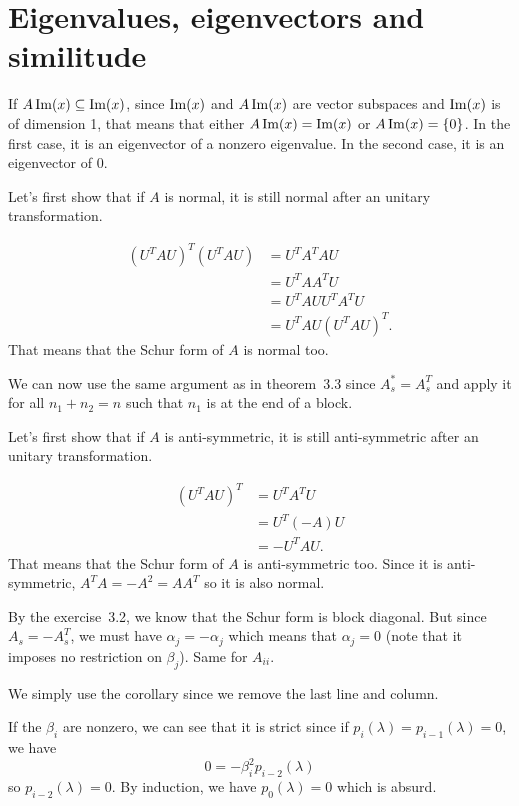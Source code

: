 \section{Eigenvalues, eigenvectors and similitude}
\begin{solution}
  If $A \operatorname{Im}(x) \subseteq \operatorname{Im}(x)$, since $\operatorname{Im}(x)$ and $A\operatorname{Im}(x)$
  are vector subspaces and $\operatorname{Im}(x)$ is of dimension 1,
  that means that either $A\operatorname{Im}(x) = \operatorname{Im}(x)$ or $A\operatorname{Im}(x) = \{0\}$.
  In the first case, it is an eigenvector of a nonzero eigenvalue.
  In the second case, it is an eigenvector of 0.
\end{solution}

\begin{solution}
  Let's first show that if $A$ is normal,
  it is still normal after an unitary transformation.

  \begin{align*}
    (U^TAU)^T(U^TAU)
    & = U^TA^TAU\\
    & = U^TAA^TU\\
    & = U^TAUU^TA^TU\\
    & = U^TAU(U^TAU)^T.
  \end{align*}
  That means that the Schur form of $A$ is normal too.

  We can now use the same argument as in theorem~3.3 since $A_s^* = A_s^T$
  and apply it for all $n_1+n_2 = n$ such that $n_1$ is at the end of a block.
\end{solution}

\begin{solution}
  Let's first show that if $A$ is anti-symmetric,
  it is still anti-symmetric after an unitary transformation.

  \begin{align*}
    (U^TAU)^T
    & = U^TA^TU\\
    & = U^T(-A)U\\
    & = -U^TAU.
  \end{align*}
  That means that the Schur form of $A$ is anti-symmetric too.
  Since it is anti-symmetric, $A^TA = -A^2 = AA^T$ so it is also normal.

  By the exercise~3.2, we know that the Schur form is block diagonal.
  But since $A_s = -A_s^T$,
  we must have $\alpha_j = -\alpha_j$ which means that $\alpha_j = 0$
  (note that it imposes no restriction on $\beta_j$).
  Same for $A_{ii}$.
\end{solution}

\begin{solution}
  We simply use the corollary since we remove the last line and column.

  If the $\beta_i$ are nonzero, we can see that it is strict since
  if $p_i(\lambda) = p_{i-1}(\lambda) = 0$, we have
  \[ 0 = -\beta_i^2 p_{i-2}(\lambda) \]
  so $p_{i-2}(\lambda) = 0$.
  By induction, we have $p_0(\lambda) = 0$ which is absurd.
\end{solution}

